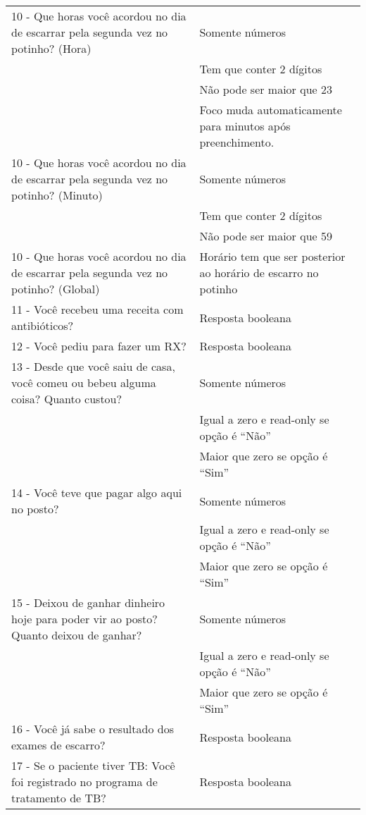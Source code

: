 \begin{longtable}{p{}|p{}}
10 - Que horas você acordou no dia de escarrar pela segunda vez no potinho? (Hora) & Somente números \\ \cline{2-2}  & Tem que conter 2 dígitos \\ \cline{2-2} & Não pode ser maior que 23 \\ \cline{2-2} & Foco muda automaticamente para minutos após preenchimento.  \\ \hline
10 - Que horas você acordou no dia de escarrar pela segunda vez no potinho? (Minuto) & Somente números \\ \cline{2-2}  & Tem que conter 2 dígitos \\ \cline{2-2} & Não pode ser maior que 59 \\ \hline
10 - Que horas você acordou no dia de escarrar pela segunda vez no potinho? (Global) & Horário tem que ser posterior ao horário de escarro no potinho \\ \hline

11 - Você recebeu uma receita com antibióticos? & Resposta booleana \\ \hline

12 - Você pediu para fazer um RX? & Resposta booleana \\ \hline

13 - Desde que você saiu de casa, você comeu ou bebeu alguma coisa? Quanto custou? & Somente números \\ \cline{2-2} & Igual a zero e read-only se opção é ``Não'' \\ \cline{2-2} & Maior que zero se opção é ``Sim'' \\ \hline

14 - Você teve que pagar algo aqui no posto? & Somente números \\ \cline{2-2} & Igual a zero e read-only se opção é ``Não'' \\ \cline{2-2} & Maior que zero se opção é ``Sim'' \\ \hline

15 - Deixou de ganhar dinheiro hoje para poder vir ao posto? Quanto deixou de ganhar? & Somente números \\ \cline{2-2} & Igual a zero e read-only se opção é ``Não'' \\ \cline{2-2} & Maior que zero se opção é ``Sim'' \\ \hline

16 - Você já sabe o resultado dos exames de escarro? & Resposta booleana \\ \hline

17 - Se o paciente tiver TB: Você foi registrado no programa de tratamento de TB? & Resposta booleana \\ \hline


\end{longtable}
